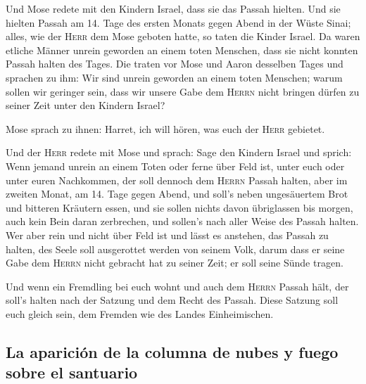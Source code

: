  Und Mose redete mit den Kindern Israel, dass sie das
Passah hielten.  Und sie hielten Passah am 14. Tage des
ersten Monats gegen Abend in der Wüste Sinai; alles, wie der
\textsc{Herr} dem Mose geboten hatte, so taten die Kinder Israel.
 Da waren etliche Männer unrein geworden an einem toten
Menschen, dass sie nicht konnten Passah halten des Tages. Die traten vor
Mose und Aaron desselben Tages  und sprachen zu ihm: Wir
sind unrein geworden an einem toten Menschen; warum sollen wir geringer
sein, dass wir unsere Gabe dem \textsc{Herrn} nicht bringen dürfen zu
seiner Zeit unter den Kindern Israel?

 Mose sprach zu ihnen: Harret, ich will hören, was euch
der \textsc{Herr} gebietet.

 Und der \textsc{Herr} redete mit Mose und sprach:
 Sage den Kindern Israel und sprich: Wenn jemand unrein
an einem Toten oder ferne über Feld ist, unter euch oder unter euren
Nachkommen, der soll dennoch dem \textsc{Herrn} Passah halten,
 aber im zweiten Monat, am 14. Tage gegen Abend, und
soll's neben ungesäuertem Brot und bitteren Kräutern essen,
 und sie sollen nichts davon übriglassen bis morgen, auch
kein Bein daran zerbrechen, und sollen's nach aller Weise des Passah
halten.  Wer aber rein und nicht über Feld ist und lässt
es anstehen, das Passah zu halten, des Seele soll ausgerottet werden von
seinem Volk, darum dass er seine Gabe dem \textsc{Herrn} nicht gebracht
hat zu seiner Zeit; er soll seine Sünde tragen.

 Und wenn ein Fremdling bei euch wohnt und auch dem
\textsc{Herrn} Passah hält, der soll's halten nach der Satzung und dem
Recht des Passah. Diese Satzung soll euch gleich sein, dem Fremden wie
des Landes Einheimischen.

\hypertarget{la-apariciuxf3n-de-la-columna-de-nubes-y-fuego-sobre-el-santuario}{%
\subsection{La aparición de la columna de nubes y fuego sobre el
santuario}\label{la-apariciuxf3n-de-la-columna-de-nubes-y-fuego-sobre-el-santuario}}

